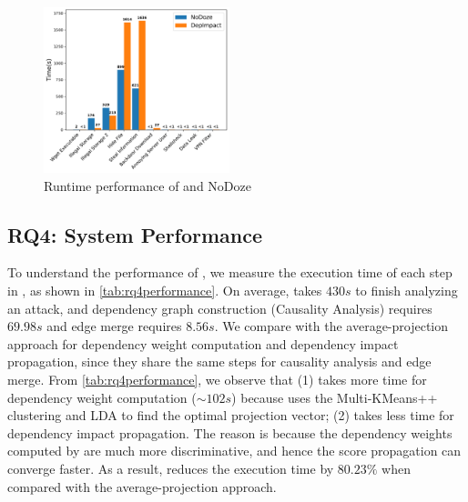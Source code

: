 %


\begin{figure}[t]
    \centering
    \includegraphics[width=0.48\textwidth]{figs/s&p/rq4.pdf}
    \caption{Runtime performance of \tool and NoDoze}
    \label{fig:rq4compare}
\end{figure}

\subsection{RQ4: System Performance}

To understand the performance of \tool, we measure the execution time of each step in \tool, as shown in \cref{tab:rq4performance}.
On average, \tool takes $430s$ to finish
analyzing an attack, and dependency graph construction (\ie Causality Analysis) requires $69.98s$ and edge merge requires $8.56s$.
%
We compare \tool with the average-projection approach for dependency weight computation and dependency impact propagation, since they share the same steps for causality analysis and edge merge. 
From \cref{tab:rq4performance}, we observe that 
(1) \tool takes more time for dependency weight computation ($\sim102s$) because \tool uses the Multi-KMeans++ clustering and LDA to find the optimal projection vector;
(2) \tool takes less time for dependency impact propagation. The reason is because the dependency weights computed by \tool are much more discriminative, and hence the score propagation can converge faster.
As a result, \tool reduces the execution time by $80.23\%$ when compared with the average-projection approach. 

